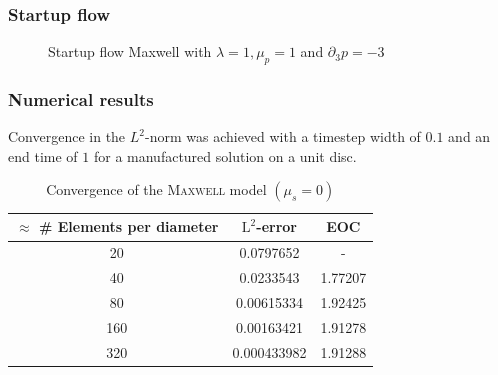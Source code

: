\documentclass[12pt,a4paper,handout]{beamer}
\theoremstyle{definition}
\theoremstyle{plain}
\begin{document}
\begin{frame}
    \frametitle{Startup flow}
    \begin{figure}
        \centering
        \caption{Startup flow Maxwell with $\lambda=1,\mu_p=1$ and $\partial_3p=-3$}
    \end{figure}
\end{frame}
\begin{frame}
    \frametitle{Numerical results}
    Convergence in the $L^2$-norm was achieved with a timestep width of $0.1$ and an end time of $1$ for a manufactured solution on a unit disc.
    \begin{table}
        \centering
        \begin{tabular}{c|c|c}
            $\approx$ \# Elements per diameter& $\mathrm{L}^2$-error&EOC\\
            \hline
            20 & 0.0797652 & -\\
            40 & 0.0233543 & 1.77207\\
            80 & 0.00615334 & 1.92425\\
            160 & 0.00163421 & 1.91278\\
            320 & 0.000433982 & 1.91288
        \end{tabular}
        \caption{Convergence of the \textsc{Maxwell} model $(\mu_s=0)$}
    \end{table}
\end{frame}
\end{document}
